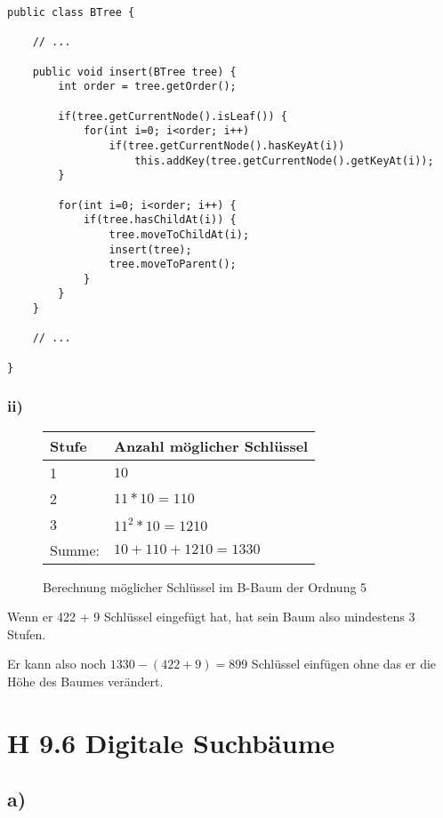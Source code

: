 \documentclass[a4paper]{article}
\begin{document}
\begin{lstlisting}
public class BTree {

	// ...

	public void insert(BTree tree) {
		int order = tree.getOrder();

		if(tree.getCurrentNode().isLeaf()) {
			for(int i=0; i<order; i++)
				if(tree.getCurrentNode().hasKeyAt(i))
					this.addKey(tree.getCurrentNode().getKeyAt(i));
		}

		for(int i=0; i<order; i++) {
			if(tree.hasChildAt(i)) {
				tree.moveToChildAt(i);
				insert(tree);
				tree.moveToParent();
			}
		}
	}

	// ...

}
\end{lstlisting}

\subsubsection*{ii)}

\begin{figure}[!h]
	\begin{center}
		\begin{tabular}[h]{|l|l|}
			\hline
			Stufe & Anzahl möglicher Schlüssel \\
			\hline
			1 & $10$               \\
			2 & $11 * 10 = 110$    \\
			3 & $11^2 * 10 = 1210$ \\
			\hline
			\hline
			Summe: & $10 + 110 + 1210 = 1330$ \\
			\hline
		\end{tabular}
	\end{center}
	\caption{Berechnung möglicher Schlüssel im B-Baum der Ordnung 5}
	\label{fig:possible_keys}
\end{figure}

Wenn er 422 + 9 Schlüssel eingefügt hat, hat sein Baum also mindestens 3
Stufen.

Er kann also noch $1330 -(422 + 9) = 899$ Schlüssel einfügen ohne das er
die Höhe des Baumes verändert.


\clearpage
\section*{H 9.6 Digitale Suchbäume}

\subsection*{a)}
\end{document}
